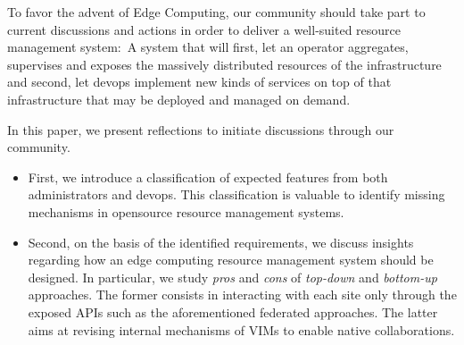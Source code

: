 To favor the advent of Edge Computing, our community should take part
to current discussions and actions in order to deliver a well-suited
resource management system:~A system that will first, let an operator
aggregates, supervises and exposes the massively distributed resources
of the infrastructure and second, let devops implement new kinds
of services on top of that infrastructure that may be deployed and
managed on demand.


In this paper, we present reflections to initiate discussions through our community.

\begin{itemize}
\item First, we introduce a classification of expected features from
  both administrators and devops. This classification is valuable to
  identify missing mechanisms in opensource resource management systems.
\item Second, on the basis of the identified requirements, we discuss
  insights regarding how an edge computing resource management system
  should be designed. In particular, we study \emph{pros} and
  \emph{cons} of \emph{top-down} and \emph{bottom-up} approaches. The
  former consists in interacting with each site only through the
  exposed APIs such as the aforementioned federated approaches. The
  latter aims at revising internal mechanisms of VIMs to enable native
  collaborations.
  \end{itemize}


